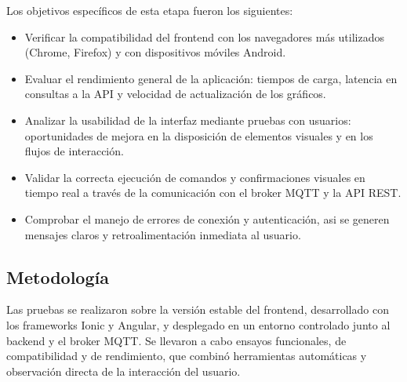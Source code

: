 Los objetivos específicos de esta etapa fueron los siguientes:
\begin{itemize}
    \item Verificar la compatibilidad del frontend con los navegadores más utilizados (Chrome, Firefox) y con dispositivos móviles Android.
    \item Evaluar el rendimiento general de la aplicación: tiempos de carga, latencia en consultas a la API y velocidad de actualización de los gráficos.
    \item Analizar la usabilidad de la interfaz mediante pruebas con usuarios:  oportunidades de mejora en la disposición de elementos visuales y en los flujos de interacción.
    \item Validar la correcta ejecución de comandos y confirmaciones visuales en tiempo real a través de la comunicación con el broker MQTT y la API REST.
    \item Comprobar el manejo de errores de conexión y autenticación, asi se generen mensajes claros y retroalimentación inmediata al usuario.
\end{itemize}


\subsection{Metodología}

Las pruebas se realizaron sobre la versión estable del frontend, desarrollado con los frameworks Ionic y Angular, y desplegado en un entorno controlado junto al backend y el broker MQTT.  
Se llevaron a cabo ensayos funcionales, de compatibilidad y de rendimiento, que combinó herramientas automáticas y observación directa de la interacción del usuario.


